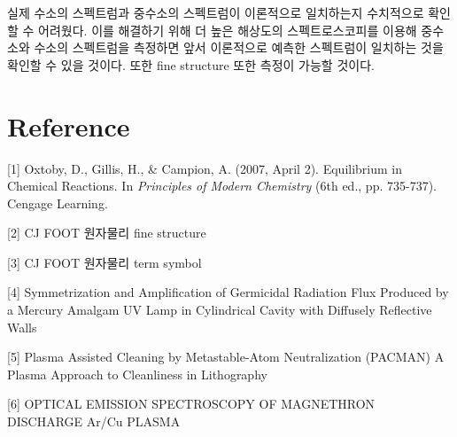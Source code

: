 \documentclass[%
 reprint,
 amsmath,amssymb,
 aps,
]{revtex4-2}
\begin{document}
실제 수소의 스펙트럼과 중수소의 스펙트럼이 이론적으로 일치하는지 수치적으로 확인할 수 어려웠다. 이를 해결하기 위해 더 높은 해상도의 스펙트로스코피를 이용해 중수소와 수소의 스펙트럼을 측정하면 앞서 이론적으로 예측한 스펙트럼이 일치하는 것을 확인할 수 있을 것이다. 또한 fine structure 또한 측정이 가능할 것이다.

\section{\label{sec:level1}Reference}
[1] Oxtoby, D., Gillis, H., \& Campion, A. (2007, April 2). Equilibrium in Chemical Reactions. In \textit{Principles of Modern Chemistry} (6th ed., pp. 735-737). Cengage Learning.

[2] CJ FOOT 원자물리 fine structure

[3] CJ FOOT 원자물리 term symbol

[4] Symmetrization and Amplification of Germicidal Radiation Flux Produced by a Mercury Amalgam UV Lamp in Cylindrical Cavity with Diffusely Reflective Walls

[5] Plasma Assisted Cleaning by Metastable-Atom Neutralization (PACMAN) A Plasma Approach to Cleanliness in Lithography

[6] OPTICAL EMISSION SPECTROSCOPY OF MAGNETHRON DISCHARGE Ar/Cu PLASMA
\end{document}
